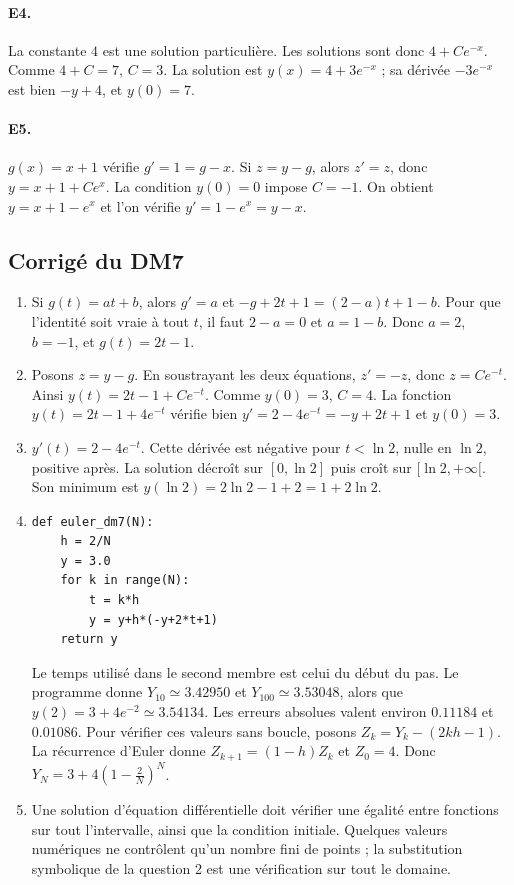 \paragraph{E4.}La constante $4$ est une solution particulière. Les solutions sont donc $4+Ce^{-x}$. Comme $4+C=7$, $C=3$. La solution est $y(x)=4+3e^{-x}$ ; sa dérivée $-3e^{-x}$ est bien $-y+4$, et $y(0)=7$.

\paragraph{E5.}$g(x)=x+1$ vérifie $g'=1=g-x$. Si $z=y-g$, alors $z'=z$, donc $y=x+1+Ce^x$. La condition $y(0)=0$ impose $C=-1$. On obtient $y=x+1-e^x$ et l'on vérifie $y'=1-e^x=y-x$.

\subsection{Corrigé du DM7}\begin{enumerate}
\item Si $g(t)=at+b$, alors $g'=a$ et $-g+2t+1=(2-a)t+1-b$. Pour que l'identité soit vraie à tout $t$, il faut $2-a=0$ et $a=1-b$. Donc $a=2$, $b=-1$, et $g(t)=2t-1$.
\item Posons $z=y-g$. En soustrayant les deux équations, $z'=-z$, donc $z=Ce^{-t}$. Ainsi $y(t)=2t-1+Ce^{-t}$. Comme $y(0)=3$, $C=4$. La fonction $y(t)=2t-1+4e^{-t}$ vérifie bien $y'=2-4e^{-t}=-y+2t+1$ et $y(0)=3$.
\item $y'(t)=2-4e^{-t}$. Cette dérivée est négative pour $t<\ln2$, nulle en $\ln2$, positive après. La solution décroît sur $[0,\ln2]$ puis croît sur $[\ln2,+\infty[$. Son minimum est $y(\ln2)=2\ln2-1+2=1+2\ln2$.
\item 
\begin{lstlisting}
def euler_dm7(N):
    h = 2/N
    y = 3.0
    for k in range(N):
        t = k*h
        y = y+h*(-y+2*t+1)
    return y
\end{lstlisting}
Le temps utilisé dans le second membre est celui du début du pas. Le programme donne $Y_{10}\simeq\num{3,42950}$ et $Y_{100}\simeq\num{3,53048}$, alors que $y(2)=3+4e^{-2}\simeq\num{3,54134}$. Les erreurs absolues valent environ $\num{0,11184}$ et $\num{0,01086}$.
Pour vérifier ces valeurs sans boucle, posons $Z_k=Y_k-(2kh-1)$. La récurrence d'Euler donne $Z_{k+1}=(1-h)Z_k$ et $Z_0=4$. Donc $Y_N=3+4(1-\frac{2}{N})^N$.
\item Une solution d'équation différentielle doit vérifier une égalité entre fonctions sur tout l'intervalle, ainsi que la condition initiale. Quelques valeurs numériques ne contrôlent qu'un nombre fini de points ; la substitution symbolique de la question 2 est une vérification sur tout le domaine.
\end{enumerate}

